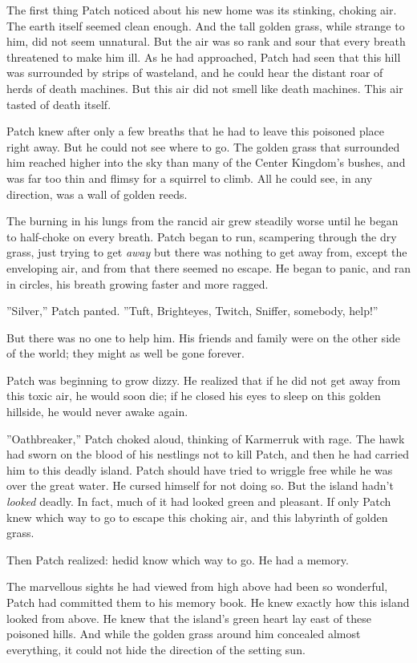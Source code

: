 \documentclass[12pt]{book}
\begin{document}
The first thing Patch noticed about his new home was its stinking, choking air. The earth itself seemed clean enough. And the tall golden grass, while strange to him, did not seem unnatural. But the air was so rank and sour that every breath threatened to make him ill. As he had approached, Patch had seen that this hill was surrounded by strips of wasteland, and he could hear the distant roar of herds of death machines. But this air did not smell like death machines. This air tasted of death itself.

Patch knew after only a few breaths that he had to leave this poisoned place right away. But he could not see where to go. The golden grass that surrounded him reached higher into the sky than many of the Center Kingdom's bushes, and was far too thin and flimsy for a squirrel to climb. All he could see, in any direction, was a wall of golden reeds. 

The burning in his lungs from the rancid air grew steadily worse until he began to half-choke on every breath. Patch began to run, scampering through the dry grass, just trying to get {\it away} %
but there was nothing to get away from, except the enveloping air, and from that there seemed no escape. He began to panic, and ran in circles, his breath growing faster and more ragged. 

''Silver,'' Patch panted. ''Tuft, Brighteyes, Twitch, Sniffer, somebody, help!''

But there was no one to help him. His friends and family were on the other side of the world; they might as well be gone forever.

Patch was beginning to grow dizzy. He realized that if he did not get away from this toxic air, he would soon die; if he closed his eyes to sleep on this golden hillside, he would never awake again.

''Oathbreaker,'' Patch choked aloud, thinking of Karmerruk with rage. The hawk had sworn on the blood of his nestlings not to kill Patch, and then he had carried him to this deadly island. Patch should have tried to wriggle free while he was over the great water. He cursed himself for not doing so. But the island hadn't {\it looked} deadly. In fact, much of it had looked green and pleasant. If only Patch knew which way to go to escape this choking air, and this labyrinth of golden grass.

Then Patch realized: he{\it  }did know which way to go. He had a memory.

The marvellous sights he had viewed from high above had been so wonderful, Patch had committed them to his memory book. He knew exactly how this island looked from above. He knew that the island's green heart lay east of these poisoned hills. And while the golden grass around him concealed almost everything, it could not hide the direction of the setting sun.
\end{document}
